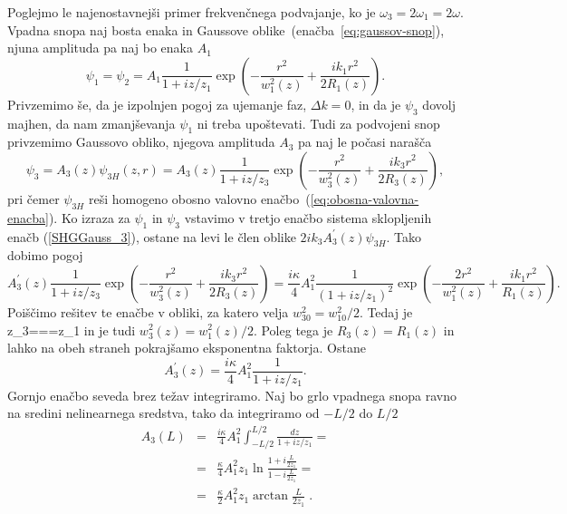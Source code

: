 Poglejmo le najenostavnejši primer frekvenčnega podvajanje, ko je 
$\omega_{3}=2\omega_{1}=2\omega$.
Vpadna snopa naj bosta enaka in Gaussove oblike~(enačba~\ref{eq:gaussov-snop}), 
njuna amplituda pa naj bo enaka $A_1$
\begin{equation}
\psi_{1} = \psi_2 = A_{1}\frac{1}{1+iz/z_1}
\exp\left(-\frac{r^{2}}{w_1^{2}(z)}+\frac{ik_1r^{2}}{2R_1(z)}\right).
\label{8.21}
\end{equation}
Privzemimo še, da je izpolnjen pogoj za ujemanje faz, $\Delta k=0$,
in da je $\psi_{3}$ dovolj majhen, da nam zmanjševanja $\psi_{1}$
ni treba upoštevati. Tudi za podvojeni snop privzemimo Gaussovo 
obliko, njegova amplituda $A_3$ pa naj le počasi narašča
\begin{equation}
\psi_{3}=A_{3}(z)\psi_{3H}(z,r)=A_{3}(z)\frac{1}{1+iz/z_{3}}
\exp\left(-\frac{r^{2}}{w_{3}^{2}(z)}+\frac{ik_{3}r^{2}}{2R_{3}(z)}\right),
\label{8.22}
\end{equation}
pri čemer $\psi_{3H}$ reši homogeno obosno valovno 
enačbo~(\ref{eq:obosna-valovna-enacba}). Ko izraza za $\psi_{1}$
in $\psi_{3}$ vstavimo v tretjo enačbo sistema sklopljenih enačb (\ref{SHGGauss_3}),
ostane na levi le člen oblike $2ik_{3}A_{3}^{\prime}(z)\psi_{3H}$. Tako dobimo pogoj
\begin{equation}
A_{3}^{\prime}(z)\frac{1}{1+iz/z_3}\exp\left(-\frac{r^{2}}{w_{3}^{2}(z)}+\frac{ik_{3}r^{2}}
{2R_{3}(z)}\right)=
\frac{i\kappa}{4}A_{1}^{2}\frac{1}{(1+iz/z_{1})^{2}}\exp\left(-\frac{2r^{2}}
{w_{1}^{2}(z)}+\frac{ik_{1}r^{2}}{R_{1}(z)}\right).
\label{8.23}
\end{equation}
Poiščimo rešitev te enačbe v obliki, za katero velja $w_{30}^{2}=w_{10}^{2}/2$. Tedaj je 
\beq
z_{3}===z_{1}
\eeq
in je tudi $w_{3}^{2}(z)=w_{1}^{2}(z)/2$. Poleg tega je $R_{3}(z)=R_{1}(z)$
in lahko na obeh straneh pokrajšamo eksponentna faktorja. Ostane 
\begin{equation}
A_{3}^{\prime}(z)=\frac{i\kappa}{4}A_{1}^{2}\frac{1}{1+iz/z_1}.
\label{8.24}
\end{equation}
Gornjo enačbo seveda brez težav integriramo. Naj bo grlo vpadnega
snopa ravno na sredini nelinearnega sredstva, tako da integriramo
od $-L/2$ do $L/2$
\begin{eqnarray}
A_{3}(L) & = & \frac{i\kappa}{4}A_{1}^{2}\int_{-L/2}^{L/2}\frac{dz}{1+iz/z_1} = \nonumber \\
 & = & \frac{\kappa}{4}A_{1}^{2}z_{1}\ln\frac{1+i\frac{L}{2z_{1}}}{1-i\frac{L}{2z_{1}}}= \nonumber \\
 & = & \frac{\kappa}{2}A_{1}^{2}z_{1}\arctan\frac{L}{2z_{1}}\;.
\end{eqnarray}
